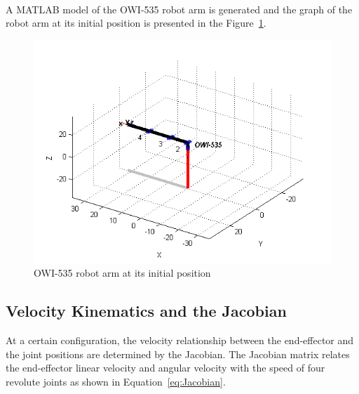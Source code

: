 \documentclass[paper=letter, fontsize=10pt]{scrartcl}	%
\numberwithin{equation}{section}															%
\numberwithin{figure}{section}																%
\numberwithin{table}{section}																%
\begin{document}
A MATLAB\textsuperscript{\textregistered} model of the OWI-535 robot arm is generated and the graph of the robot arm at its initial position is presented in the Figure~\ref{fig:OWI_INITIAL_POSITION}.

\begin{figure}[h!]
  \centering
    \includegraphics[width=.5\textwidth]{./Images/OWI_INITIAL_POSITION}
    \caption{OWI-535 robot arm at its initial position}
    \label{fig:OWI_INITIAL_POSITION}
\end{figure}
\subsection{Velocity Kinematics and the Jacobian}
At a certain configuration, the velocity relationship between the end-effector and the joint positions are determined by the Jacobian. The Jacobian matrix relates the end-effector linear velocity and angular velocity with the speed of four revolute joints as shown in Equation~\eqref{eq:Jacobian}.
\end{document}
